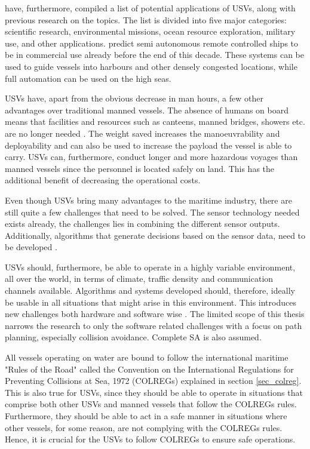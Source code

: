 \textcite{liu2016unmanned} have, furthermore, compiled a list of potential applications of USVs, along with previous research on the topics.
The list is divided into five major categories: scientific research, environmental missions, ocean resource exploration, military use, and other applications.
\textcite{jokioinen2016remote} predict semi autonomous remote controlled ships to be in commercial use already before the end of this decade. These systems can be used to guide vessels into harbours and other densely congested locations, while full automation can be used on the high seas.

USVs have, apart from the obvious decrease in man hours, a few other advantages over traditional manned vessels. The absence of humans on board means that facilities and resources such as canteens,  manned bridges, showers etc. are no longer needed . The weight saved increases the manoeuvrability and deployability and can also be used to increase the payload the vessel is able to carry. USVs can, furthermore, conduct longer and more hazardous voyages than manned vessels since the personnel is located safely on land. This has the additional benefit of decreasing the operational costs\cite{liu2016unmanned,jokioinen2016remote}.



Even though USVs bring many advantages to the maritime industry, there are still quite a few challenges that need to be solved. The sensor technology needed exists already, the challenges lies in combining the different sensor outputs. Additionally, algorithms that generate decisions based on the sensor data, need to be developed \cite{jokioinen2016remote}.

USVs should, furthermore, be able to operate in a highly variable environment, all over the world, in terms of climate, traffic density and communication channels available.  Algorithms and systems developed should, therefore, ideally be usable in all situations that might arise in this environment. This introduces new challenges both hardware and software wise \cite{liu2016unmanned}. The limited scope of this thesis narrows the research to only the software related challenges with a focus on path planning, especially collision avoidance. Complete SA is also assumed.

All vessels operating on water are bound to follow the international maritime "Rules of the Road" called the Convention on the International Regulations for Preventing Collisions at Sea, 1972 (COLREGs) explained in section \ref{sec_colreg}. This is also true for USVs, since they should be able to operate in situations that comprise both other USVs and manned vessels that follow the COLREGs rules. Furthermore, they should be able to  act in a safe manner in situations where other vessels, for some reason, are not complying with the COLREGs rules. Hence, it is crucial for the USVs to follow COLREGs to ensure safe operations.


